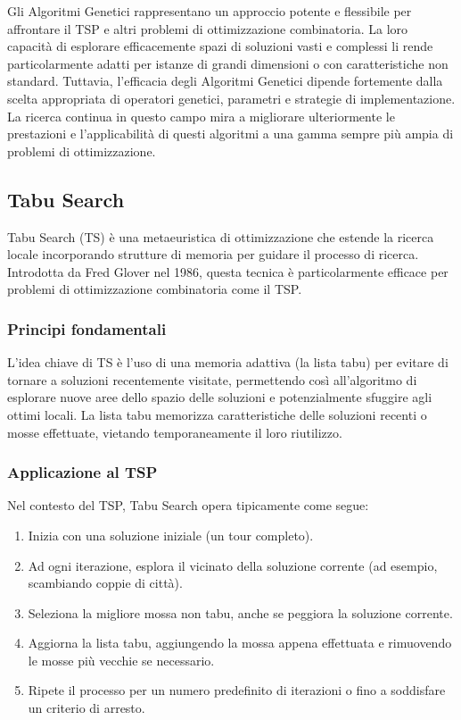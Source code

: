 Gli Algoritmi Genetici rappresentano un approccio potente e flessibile per affrontare il \gls{TSP} e altri problemi di ottimizzazione combinatoria. La loro capacità di esplorare efficacemente spazi di soluzioni vasti e complessi li rende particolarmente adatti per istanze di grandi dimensioni o con caratteristiche non standard. Tuttavia, l'efficacia degli Algoritmi Genetici dipende fortemente dalla scelta appropriata di operatori genetici, parametri e strategie di implementazione. La ricerca continua in questo campo mira a migliorare ulteriormente le prestazioni e l'applicabilità di questi algoritmi a una gamma sempre più ampia di problemi di ottimizzazione.

\subsection{Tabu Search}

Tabu Search (\gls{TS}) è una metaeuristica di ottimizzazione che estende la ricerca locale incorporando strutture di memoria per guidare il processo di ricerca. Introdotta da Fred Glover nel 1986, questa tecnica è particolarmente efficace per problemi di ottimizzazione combinatoria come il \gls{TSP}.

\subsubsection{Principi fondamentali}

L'idea chiave di \gls{TS} è l'uso di una memoria adattiva (la lista tabu) per evitare di tornare a soluzioni recentemente visitate, permettendo così all'algoritmo di esplorare nuove aree dello spazio delle soluzioni e potenzialmente sfuggire agli ottimi locali. La lista tabu memorizza caratteristiche delle soluzioni recenti o mosse effettuate, vietando temporaneamente il loro riutilizzo.

\subsubsection{Applicazione al \gls{TSP}}

Nel contesto del \gls{TSP}, Tabu Search opera tipicamente come segue:

\begin{enumerate}
	\item Inizia con una soluzione iniziale (un tour completo).
	\item Ad ogni iterazione, esplora il vicinato della soluzione corrente (ad esempio, scambiando coppie di città).
	\item Seleziona la migliore mossa non tabu, anche se peggiora la soluzione corrente.
	\item Aggiorna la lista tabu, aggiungendo la mossa appena effettuata e rimuovendo le mosse più vecchie se necessario.
	\item Ripete il processo per un numero predefinito di iterazioni o fino a soddisfare un criterio di arresto.
\end{enumerate}

